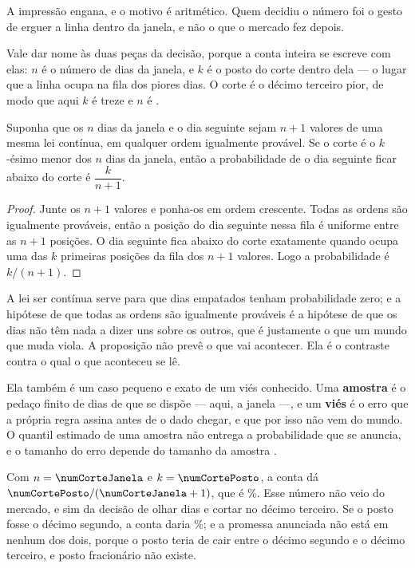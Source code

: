 A impressão engana, e o motivo é aritmético. Quem decidiu o número foi o gesto de erguer a
linha dentro da janela, e não o que o mercado fez depois.

Vale dar nome às duas peças da decisão, porque a conta inteira se escreve com elas: $n$ é o
número de dias da janela, e $k$ é o posto do corte dentro dela --- o lugar que a linha ocupa na
fila dos piores dias. O corte é o décimo terceiro pior, de modo que aqui $k$ é treze e $n$ é
\numCorteJanela.

\begin{proposicao}
\label{prop:conta}
Suponha que os $n$ dias da janela e o dia seguinte sejam $n+1$ valores de uma mesma lei
contínua, em qualquer ordem igualmente provável. Se o corte é o $k$-ésimo menor dos $n$
dias da janela, então a probabilidade de o dia seguinte ficar abaixo do corte é
$\dfrac{k}{n+1}$.
\end{proposicao}

\begin{proof}
Junte os $n+1$ valores e ponha-os em ordem crescente. Todas as ordens são igualmente
prováveis, então a posição do dia seguinte nessa fila é uniforme entre as $n+1$ posições. O
dia seguinte fica abaixo do corte exatamente quando ocupa uma das $k$ primeiras posições da
fila dos $n+1$ valores. Logo a probabilidade é $k/(n+1)$.
\end{proof}

A lei ser contínua serve para que dias empatados tenham probabilidade zero; e a hipótese de
que todas as ordens são igualmente prováveis é a hipótese de que os dias não têm nada a dizer
uns sobre os outros, que é justamente o que um mundo que muda viola. A proposição não prevê o
que vai acontecer. Ela é o contraste contra o qual o que aconteceu se lê.

Ela também é um caso pequeno e exato de um viés conhecido. Uma \textbf{amostra} é o pedaço
finito de dias de que se dispõe --- aqui, a janela ---, e um \textbf{viés} é o erro que a própria
regra assina antes de o dado chegar, e que por isso não vem do mundo.
O quantil estimado de uma amostra não entrega a probabilidade que se anuncia, e o tamanho do
erro depende do tamanho da amostra \cite{taleb2020super}.

Com $n = \numCorteJanela$ e $k = \numCortePosto$, a conta dá
$\numCortePosto/(\numCorteJanela+1)$, que é \numCorteContaPct\%. Esse número não veio do
mercado, e sim da decisão de olhar \numCorteJanela{} dias e cortar no décimo terceiro. Se o
posto fosse o décimo segundo, a conta daria \numCorteAlternativoPct\%; e a promessa anunciada
não está em nenhum dos dois, porque o posto teria de cair entre o décimo segundo e o décimo
terceiro, e posto fracionário não existe.

